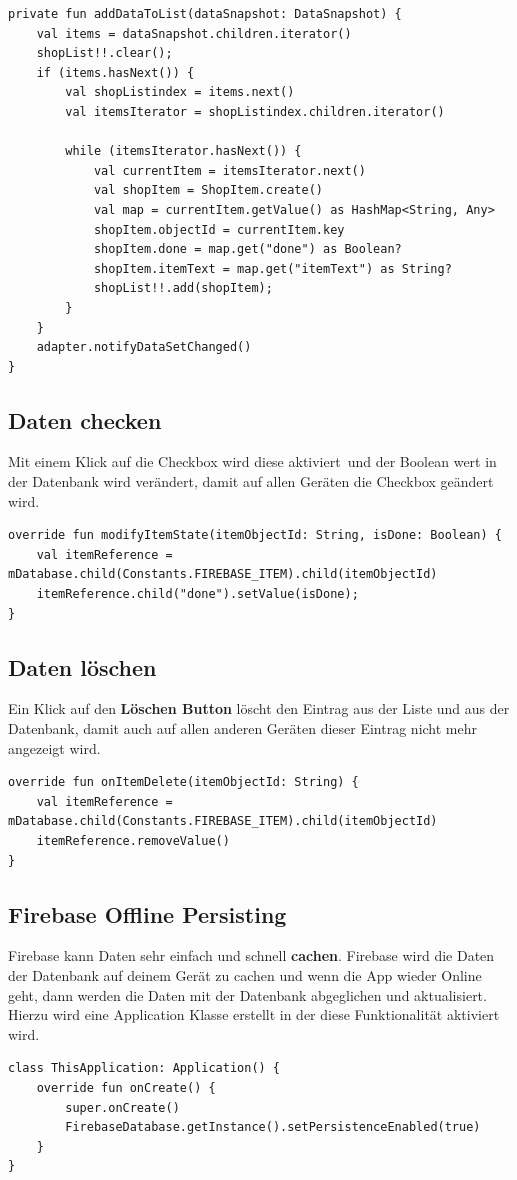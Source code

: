 \begin{lstlisting}
private fun addDataToList(dataSnapshot: DataSnapshot) {
	val items = dataSnapshot.children.iterator()
	shopList!!.clear();
	if (items.hasNext()) {
		val shopListindex = items.next()
		val itemsIterator = shopListindex.children.iterator()

		while (itemsIterator.hasNext()) {
			val currentItem = itemsIterator.next()
			val shopItem = ShopItem.create()
			val map = currentItem.getValue() as HashMap<String, Any>
			shopItem.objectId = currentItem.key
			shopItem.done = map.get("done") as Boolean?
			shopItem.itemText = map.get("itemText") as String?
			shopList!!.add(shopItem);
		}
	}
	adapter.notifyDataSetChanged()
}
\end{lstlisting}

\clearpage

\subsection{Daten checken}
Mit einem Klick auf die Checkbox wird diese \glqq aktiviert\grqq \ und der Boolean wert in der Datenbank wird verändert, damit auf allen Geräten die Checkbox geändert wird.

\begin{lstlisting}
override fun modifyItemState(itemObjectId: String, isDone: Boolean) {
	val itemReference = mDatabase.child(Constants.FIREBASE_ITEM).child(itemObjectId)
	itemReference.child("done").setValue(isDone);
}
\end{lstlisting}

\subsection{Daten löschen}
Ein Klick auf den \textbf{Löschen Button} löscht den Eintrag aus der Liste und aus der Datenbank, damit auch auf allen anderen Geräten dieser Eintrag nicht mehr angezeigt wird.

\begin{lstlisting}
override fun onItemDelete(itemObjectId: String) {
	val itemReference = mDatabase.child(Constants.FIREBASE_ITEM).child(itemObjectId)
	itemReference.removeValue()
}
\end{lstlisting}

\subsection{Firebase Offline Persisting}
Firebase kann Daten sehr einfach und schnell \textbf{cachen}. Firebase wird die Daten der Datenbank auf deinem Gerät zu cachen und wenn die App wieder Online geht, dann werden die Daten mit der Datenbank abgeglichen und aktualisiert.
\\ Hierzu wird eine Application Klasse erstellt in der diese Funktionalität aktiviert wird.

\begin{lstlisting}
class ThisApplication: Application() {
	override fun onCreate() {
		super.onCreate()
		FirebaseDatabase.getInstance().setPersistenceEnabled(true)
	}
}
\end{lstlisting}



\clearpage
